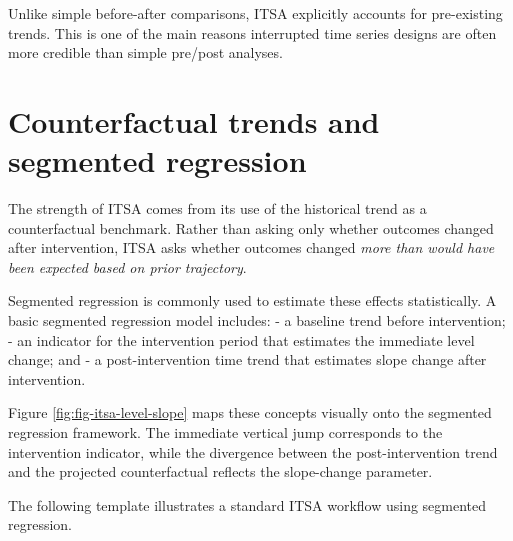 \documentclass[
  11pt,
  oneside]{book}
\begin{document}
Unlike simple before-after comparisons, ITSA explicitly accounts for pre-existing trends. This is one of the main reasons interrupted time series designs are often more credible than simple pre/post analyses.

\section{Counterfactual trends and segmented regression}\label{counterfactual-trends-and-segmented-regression}

The strength of ITSA comes from its use of the historical trend as a counterfactual benchmark. Rather than asking only whether outcomes changed after intervention, ITSA asks whether outcomes changed \emph{more than would have been expected based on prior trajectory}.

Segmented regression is commonly used to estimate these effects statistically. A basic segmented regression model includes:
- a baseline trend before intervention;
- an indicator for the intervention period that estimates the immediate level change; and
- a post-intervention time trend that estimates slope change after intervention.

Figure \ref{fig:fig-itsa-level-slope} maps these concepts visually onto the segmented regression framework. The immediate vertical jump corresponds to the intervention indicator, while the divergence between the post-intervention trend and the projected counterfactual reflects the slope-change parameter.

The following template illustrates a standard ITSA workflow using segmented regression.
\end{document}
